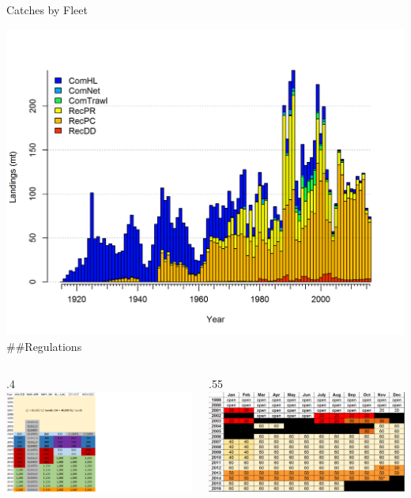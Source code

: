 \documentclass[ignorenonframetext,]{beamer}
\def\begincols{\begin{columns}}
\def\begincol{\begin{column}}
\def\endcol{\end{column}}
\def\endcols{\end{columns}}
\begin{document}
\begin{frame}{Catches by Fleet}

\centering
\includegraphics{r4ss/plots_mod1/catch2 landings stacked.png}
\#\#Regulations \begincols
 \begincol{.4\textwidth} \includegraphics{Figures/Com_regs.png} \endcol
 \begincol{.55\textwidth} \includegraphics{Figures/Rec_regs.pdf}\\
\endcol
\endcols

\end{frame}
\end{document}
